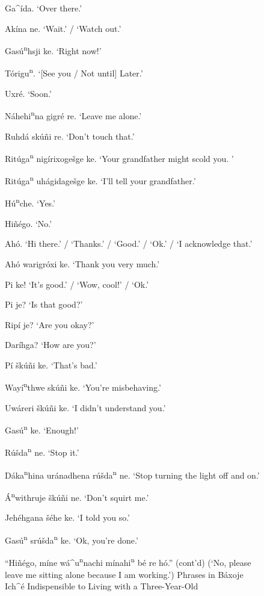 \documentclass[output=paper]{LSP/langsci}
\begin{document}
\begin{figure}[p]
\begin{list}{}{} \itemsep1pt \parskip0pt 
\item{Ga\^{ }\'ida. `Over there.'}
\item{Akína ne.	`Wait.' / `Watch out.'}
\item{Gas\'u\textsuperscript{n}hsji ke. `Right now!'  }
\item{Tórigu\textsuperscript{n}.	`[See you / Not until] Later.'}
\item{Uxr\'e. `Soon.'}
\item{N\'ahehi\textsuperscript{n}na gigr\'e re. `Leave me alone.'}
\item{Ruhd\'a sk\'u\~ni re. `Don't touch that.'}
\item{Rit\'uga\textsuperscript{n} nig\'irixoge\v{s}ge ke. `Your grandfather might scold you. '}
\item{Rit\'uga\textsuperscript{n} uh\'agidage\v{s}ge ke. `I'll tell your grandfather.'}
\item{}
\item{H\'u\textsuperscript{n}che.	`Yes.'}
\item{Hi\~n\'ego. `No.'}
\item{Ah\'o.	`Hi there.' / `Thanks.' / `Good.' / `Ok.' / `I acknowledge that.'}
\item{Ah\'o warigróxi ke. `Thank you very much.'}
\item{Pi ke! `It's good.' / `Wow, cool!' / `Ok.'}
\item{Pi je? `Is that good?'}
\item{Rip\'i je? `Are you okay?'}
\item{Dar\'ihga? `How are you?'}
\item{P\'i \v{s}k\'u\~ni ke. `That's bad.'}
\item{Way\'i\textsuperscript{n}thwe sk\'u\~ni ke. `You're misbehaving.'}
\item{Uw\'areri \v{s}k\'u\~ni ke. `I didn't understand you.'}
\item{Gas\'u\textsuperscript{n} ke. `Enough!'}
\item{R\'u\v{s}da\textsuperscript{n} ne. `Stop it.'}
\item{D\'aka\textsuperscript{n}hina ur\'anadhena r\'u\v{s}da\textsuperscript{n} ne. `Stop turning the light off and on.'}
\item{\'A\textsuperscript{n}withruje šk\'u\~ni ne. `Don't squirt me.'}
\item{}
\item{Jeh\'ehgana \v{s}\'ehe ke. `I told you so.'}
\item{Gas\'u\textsuperscript{n} sr\'u\v{s}da\textsuperscript{n} ke. `Ok, you're done.'}
\end{list} 
\caption{``Hi\~n\'ego, m\'ine w\'a\^{ }u\textsuperscript{n}nachi m\'inahi\textsuperscript{n} b\'e re h\'o.'' (cont'd)\newline
(`No, please leave me sitting alone because I am working.')\newline
Phrases in B\'axoje Ich\^{ }\'e Indispensible to Living with a Three-Year-Old}
\label{phraselist4}
\end{figure}
\FloatBarrier
\end{document}
